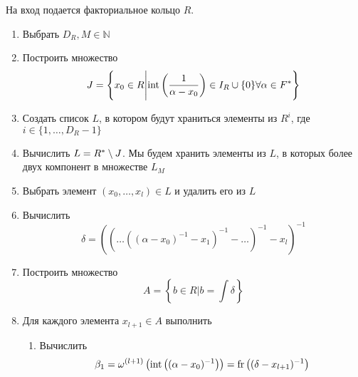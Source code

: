 \documentclass[_00_dissertation.tex]{subfiles}
\begin{document}
\begin{algorithm}\label{algorithm:R_in_T}
    На вход подается факториальное кольцо $R$.
    
    \begin{enumerate}
        \item Выбрать $D_R, M \in \mathbb{N}$
        
        \item Построить множество
        \begin{equation*}
            J = \left\{
                x_0 \in R \Bigg| \textrm{int}\left(\frac{1}{\alpha-x_0}\right) \in I_{R} \cup \{0\} \forall \alpha \in F^{*}
            \right\}
        \end{equation*}
        
        \item Создать список $L$, в котором будут храниться элементы из $R^i$, где $i \in \{1, \ldots, D_R - 1\}$

        \item Вычислить $L = R^{*} \setminus J$.
        Мы будем хранить элементы из $L$, в которых более двух компонент в множестве $L_M$

        \item\label{step:every_element_in_L} Выбрать элемент $(x_0, \ldots, x_l) \in L$ и удалить его из $L$

        \item Вычислить
        \begin{equation*}
            \delta = \left(
                \left(
                    \ldots\left(
                        \left(
                            \alpha - x_0
                        \right)^{-1} - x_1
                    \right)^{-1} - \ldots
                \right)^{-1} - x_l
            \right)^{-1}
        \end{equation*}

        \item Построить множество
        \begin{equation*}
            A = \left\{
                b \in R \big| b = \int{\delta}
            \right\}
        \end{equation*}

        \item\label{step:every_element_in_A} Для каждого элемента $x_{l+1} \in A$ выполнить
        \begin{enumerate}
            \item Вычислить
            \begin{equation*}
                \beta_1 = \omega^{(l+1)}\left(
                    \textrm{int}\left((\alpha-x_0)^{-1}\right)
                \right) = \textrm{fr}\left((\delta-x_{l+1})^{-1}\right)
            \end{equation*}


\end{enumerate}
\end{enumerate}
\end{algorithm}
\end{document}
